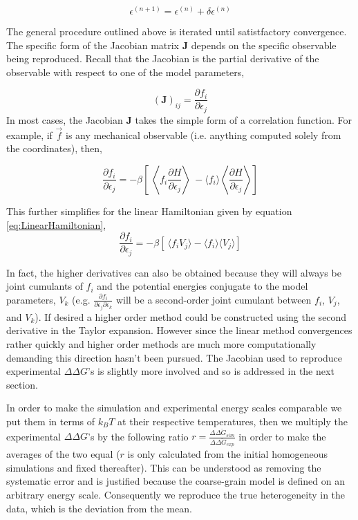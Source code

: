 \documentclass[preprint]{elsarticle}
\begin{document}
\begin{equation}
    \epsilon^{(n+1)} = \epsilon^{(n)} + \delta\epsilon^{(n)}
\end{equation}

    The general procedure outlined above is iterated until satistfactory
convergence. The specific form of the Jacobian matrix $\bm{J}$ depends on the
specific observable being reproduced. Recall that the Jacobian is the partial
derivative of the observable with respect to one of the model parameters,

\begin{equation}
    \left(\bm{J}\right)_{ij} = \frac{\partial f_i}{\partial\epsilon_j} 
\end{equation}
    In most cases, the Jacobian $\bm{J}$ takes the simple form of a correlation
function. For example, if $\vec{f}$ is any mechanical observable (i.e. anything
computed solely from the coordinates), then,

\begin{equation}
    \frac{\partial f_i}{\partial\epsilon_j} = -\beta\left[ \
    \left\langle f_i \frac{\partial H}{\partial\epsilon_j}\right\rangle \
  - \langle f_i \rangle \left\langle \frac{\partial H}{\partial\epsilon_j} \right\rangle\right]  
\end{equation}

    This further simplifies for the linear Hamiltonian given by equation
\ref{eq:LinearHamiltonian},
\begin{equation} \label{eq:JacobianStructural}
    \frac{\partial f_i}{\partial\epsilon_j} = -\beta\left[ \
    \langle f_i V_j \rangle - \langle f_i \rangle \langle V_j \rangle\right]  
\end{equation}

    In fact, the higher derivatives can also be obtained because
they will always be joint cumulants of $f_i$ and the potential energies
conjugate to the model parameters, ${V_k}$ (e.g. $\frac{\partial
f_i}{\partial\epsilon_j\partial\epsilon_k}$ will be a second-order joint
cumulant between $f_i$, $V_j$, and $V_k$). If desired a higher order method
could be constructed using the second derivative in the Taylor expansion.
However since the linear method convergences rather quickly and higher order
methods are much more computationally demanding this direction hasn't been
pursued. The Jacobian used to reproduce experimental $\Delta\Delta G$'s
is slightly more involved and so is addressed in the next section.

    In order to make the simulation and experimental energy scales comparable
we put them in terms of $k_BT$ at their respective temperatures, then we
multiply the experimental $\Delta\Delta G$'s by the following ratio $r =
\frac{\overline{\Delta\Delta G_{sim}}}{\overline{\Delta\Delta G_{exp}}}$ in order
to make the averages of the two equal ($r$ is only calculated from the initial
homogeneous simulations and fixed thereafter). This can be understood as
removing the systematic error and is justified because the coarse-grain model
is defined on an arbitrary energy scale. Consequently we reproduce the true
heterogeneity in the data, which is the deviation from the mean.
\end{document}
